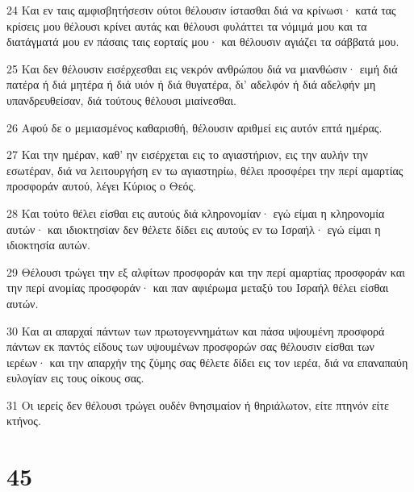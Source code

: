 \par 24 Και εν ταις αμφισβητήσεσιν ούτοι θέλουσιν ίστασθαι διά να κρίνωσι· κατά τας κρίσεις μου θέλουσι κρίνει αυτάς και θέλουσι φυλάττει τα νόμιμά μου και τα διατάγματά μου εν πάσαις ταις εορταίς μου· και θέλουσιν αγιάζει τα σάββατά μου.
\par 25 Και δεν θέλουσιν εισέρχεσθαι εις νεκρόν ανθρώπου διά να μιανθώσιν· ειμή διά πατέρα ή διά μητέρα ή διά υιόν ή διά θυγατέρα, δι' αδελφόν ή διά αδελφήν μη υπανδρευθείσαν, διά τούτους θέλουσι μιαίνεσθαι.
\par 26 Αφού δε ο μεμιασμένος καθαρισθή, θέλουσιν αριθμεί εις αυτόν επτά ημέρας.
\par 27 Και την ημέραν, καθ' ην εισέρχεται εις το αγιαστήριον, εις την αυλήν την εσωτέραν, διά να λειτουργήση εν τω αγιαστηρίω, θέλει προσφέρει την περί αμαρτίας προσφοράν αυτού, λέγει Κύριος ο Θεός.
\par 28 Και τούτο θέλει είσθαι εις αυτούς διά κληρονομίαν· εγώ είμαι η κληρονομία αυτών· και ιδιοκτησίαν δεν θέλετε δίδει εις αυτούς εν τω Ισραήλ· εγώ είμαι η ιδιοκτησία αυτών.
\par 29 Θέλουσι τρώγει την εξ αλφίτων προσφοράν και την περί αμαρτίας προσφοράν και την περί ανομίας προσφοράν· και παν αφιέρωμα μεταξύ του Ισραήλ θέλει είσθαι αυτών.
\par 30 Και αι απαρχαί πάντων των πρωτογεννημάτων και πάσα υψουμένη προσφορά πάντων εκ παντός είδους των υψουμένων προσφορών σας θέλουσιν είσθαι των ιερέων· και την απαρχήν της ζύμης σας θέλετε δίδει εις τον ιερέα, διά να επαναπαύη ευλογίαν εις τους οίκους σας.
\par 31 Οι ιερείς δεν θέλουσι τρώγει ουδέν θνησιμαίον ή θηριάλωτον, είτε πτηνόν είτε κτήνος.

\chapter{45}

